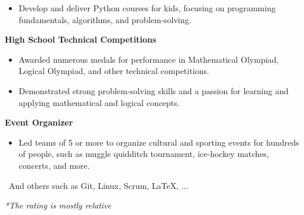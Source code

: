 \documentclass[10pt,a4paper,ragged2e]{altacv}
\begin{document}
\vspace{2px}

\begin{itemize}
\item Develop and deliver Python courses for kids, focusing on programming fundamentals, algorithms, and problem-solving.
\end{itemize}

\vspace{4px}

\textbf{High School Technical Competitions}

\vspace{2px}

\begin{itemize}
\item Awarded numerous medals for performance in Mathematical Olympiad, Logical Olympiad, and other technical competitions.
\item Demonstrated strong problem-solving skills and a passion for learning and applying mathematical and logical concepts.
\end{itemize}

\vspace{4px}

\textbf{Event Organizer}

\vspace{2px}

\begin{itemize}
\item Led teams of 5 or more to organize cultural and sporting events for hundreds of people, such as muggle quidditch tournament, ice-hockey matches, concerts, and more.
\end{itemize}

\vspace{8px}




\vspace{10px} \ And others such as Git, Linux, Scrum, LaTeX, ...

\vspace{10px} \textit{*The rating is mostly relative}

\clearpage

\nocite{*}






\end{document}
